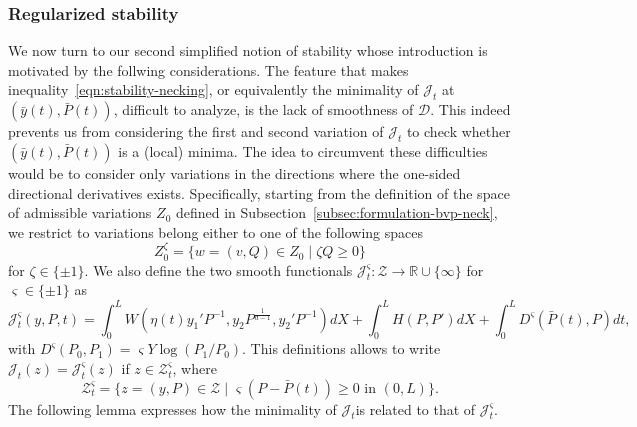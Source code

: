 \documentclass[a4paper,10pt,twoside]{amsbook}
\numberwithin{section}{chapter}
\numberwithin{equation}{chapter}
\theoremstyle{definition}
\begin{document}
\subsubsection*{Regularized stability}

We now turn to our second simplified notion of stability whose introduction is motivated by the follwing considerations. The feature that makes inequality~\eqref{eqn:stability-necking}, or equivalently the minimality of $\mathcal{J}_t$ at $(\bar{y}(t),\bar{P}(t))$, difficult to analyze, is the lack of smoothness of $\mathcal{D}$. This indeed prevents us from considering the first and second variation of $\mathcal{J}_t$ to check whether $(\bar{y}(t),\bar{P}(t))$ is a (local) minima. The idea to circumvent these difficulties would be to consider only variations in the directions where the one-sided directional derivatives exists. Specifically, starting from the definition of the space of admissible variations $Z_0$ defined in Subsection~\ref{subsec:formulation-bvp-neck}, we restrict to variations belong either to one of the following spaces
\[
Z_0^\zeta=\{w=(v,Q)\in Z_0\;|\;\zeta Q\ge0\}
\]
for $\zeta\in\{\pm1\}$. We also define the two smooth functionals $\mathcal{J}_t^\varsigma\colon\mathscr{Z}\to\mathbb{R}\cup\{\infty\}$ for $\varsigma\in\{\pm1\}$ as
\[
\mathcal{J}_t^\varsigma(y,P,t)=\int_0^LW(\eta(t)y_1'P^{-1},y_2P^\frac{1}{d-1},y_2'P^{-1})dX+\int_0^LH(P,P')dX+\int_0^LD^\varsigma(\bar P(t),P)dt,
\]
with $D^\varsigma(P_0,P_1)=\varsigma Y\log(P_1/P_0)$. This definitions allows to write $\mathcal{J}_t(z)=\mathcal{J}_t^\varsigma(z)$ if $z\in\mathscr{Z}^\varsigma_t$, where
\[
\mathscr{Z}^\varsigma_t=\{z=(y,P)\in\mathscr{Z}\;|\;\text{$\varsigma(P-\bar P(t))\ge0$ in $(0,L)$}\}.
\]
The following lemma expresses how the minimality of $\mathcal{J}_t$is related to that of $\mathcal{J}_t^\varsigma$.
\end{document}
